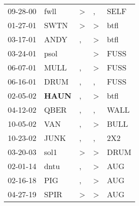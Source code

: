 \begin{supertabular}{p{0.07\textwidth}p{0.06\textwidth}p{0.02\textwidth}p{0.02\textwidth}p{0.06\textwidth}}
 09-28-00\textsuperscript{} &           fwll\textsuperscript{} &  \textgreater &             , &  SELF\textsuperscript{} \\
 01-27-01\textsuperscript{} &           SWTN\textsuperscript{} &  \textgreater &  \textgreater &  btfl\textsuperscript{} \\
 03-17-01\textsuperscript{} &           ANDY\textsuperscript{} &             , &  \textgreater &  btfl\textsuperscript{} \\
 03-24-01\textsuperscript{} &           psol\textsuperscript{} &               &  \textgreater &  FUSS\textsuperscript{} \\
 06-07-01\textsuperscript{} &           MULL\textsuperscript{} &             , &  \textgreater &  FUSS\textsuperscript{} \\
 06-16-01\textsuperscript{} &           DRUM\textsuperscript{} &             , &             , &  FUSS\textsuperscript{} \\
 02-05-02\textsuperscript{} &  \textbf{HAUN\textsuperscript{}} &             , &  \textgreater &  btfl\textsuperscript{} \\
 04-12-02\textsuperscript{} &           QBER\textsuperscript{} &             , &             , &  WALL\textsuperscript{} \\
 10-05-02\textsuperscript{} &            VAN\textsuperscript{} &             , &  \textgreater &  BULL\textsuperscript{} \\
 10-23-02\textsuperscript{} &           JUNK\textsuperscript{} &             , &             , &   2X2\textsuperscript{} \\
 03-20-03\textsuperscript{} &           sol1\textsuperscript{} &  \textgreater &  \textgreater &  DRUM\textsuperscript{} \\
 02-01-14\textsuperscript{} &           dntu\textsuperscript{} &             , &  \textgreater &   AUG\textsuperscript{} \\
 02-16-18\textsuperscript{} &            PIG\textsuperscript{} &             , &  \textgreater &   AUG\textsuperscript{} \\
 04-27-19\textsuperscript{} &           SPIR\textsuperscript{} &  \textgreater &  \textgreater &   AUG\textsuperscript{} \\
\end{supertabular}
